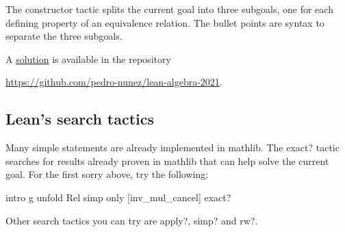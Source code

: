 \documentclass[12pt, a4paper]{article}
\theoremstyle{definition}
\begin{document}
The {\ttfamily constructor} tactic splits the current goal into three subgoals,
one for each defining property of an equivalence relation.
The bullet points are syntax to separate the three subgoals.

A \href{https://github.com/pedro-nunez/lean-algebra-2021/blob/master/equivalence-relation/solution.lean}{solution} is available in the repository
\begin{center}
  \href{https://github.com/pedro-nunez/lean-algebra-2021}{https://github.com/pedro-nunez/lean-algebra-2021}.
\end{center}

\subsection*{Lean's search tactics}

Many simple statements are already implemented in mathlib.
The {\ttfamily exact?} tactic searches for results already proven in mathlib
that can help solve the current goal.
For the first {\ttfamily sorry} above, try the following:

\begin{leancode}
  intro g
  unfold Rel
  simp only [inv_mul_cancel]
  exact?
\end{leancode}

Other search tactics you can try are {\ttfamily apply?}, {\ttfamily simp?} and {\ttfamily rw?}.

{\renewcommand{\thefootnote}{\fnsymbol{footnote}}}
\end{document}

